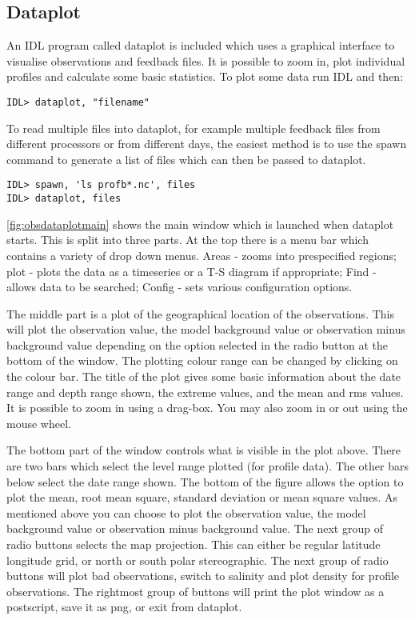 \documentclass[../tex_main/NEMO_manual]{subfiles}
\begin{document}
\subsection{Dataplot}

An IDL program called dataplot is included which uses a graphical interface to visualise
observations and feedback files. It is possible to zoom in, plot individual profiles and
calculate some basic statistics. To plot some data run IDL and then:
\footnotesize
\begin{verbatim}
IDL> dataplot, "filename"
\end{verbatim}

To read multiple files into dataplot, for example multiple feedback files from different
processors or from different days, the easiest method is to use the spawn command to generate
a list of files which can then be passed to dataplot.
\footnotesize
\begin{verbatim}
IDL> spawn, 'ls profb*.nc', files
IDL> dataplot, files
\end{verbatim}

\autoref{fig:obsdataplotmain} shows the main window which is launched when dataplot starts.
This is split into three parts. At the top there is a menu bar which contains a variety of
drop down menus. Areas - zooms into prespecified regions; plot - plots the data as a
timeseries or a T-S diagram if appropriate; Find - allows data to be searched; Config - sets
various configuration options.

The middle part is a plot of the geographical location of the observations. This will plot the
observation value, the model background value or observation minus background value depending
on the option selected in the radio button at the bottom of the window. The plotting colour
range can be changed by clicking on the colour bar. The title of the plot gives some basic
information about the date range and depth range shown, the extreme values, and the mean and
rms values. It is possible to zoom in using a drag-box. You may also zoom in or out using the
mouse wheel.

The bottom part of the window controls what is visible in the plot above. There are two bars
which select the level range plotted (for profile data). The other bars below select the date
range shown. The bottom of the figure allows the option to plot the mean, root mean square,
standard deviation or mean square values. As mentioned above you can choose to plot the
observation value, the model background value or observation minus background value. The next
group of radio buttons selects the map projection. This can either be regular latitude
longitude grid, or north or south polar stereographic. The next group of radio buttons will
plot bad observations, switch to salinity and plot density for profile observations. The
rightmost group of buttons will print the plot window as a postscript, save it as png, or exit
from dataplot.
\end{document}

